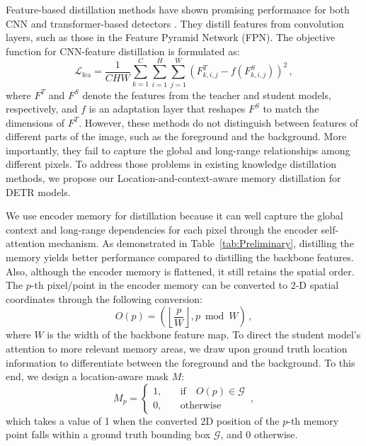 Feature-based distillation methods have shown promising performance for both CNN and transformer-based detectors \cite{wang2019distilling, yang2022focal, chang2023detrdistill}. They distill features from convolution layers, such as those in the Feature Pyramid Network (FPN). The objective function for CNN-feature distillation is formulated as:
\begin{equation}
\mathcal{L}_{\text{fea}} = \frac{1}{CHW} \sum_{k=1}^{C} \sum_{i=1}^{H} \sum_{j=1}^{W} \left( F^T_{k,i,j} - f(F^S_{k,i,j}) \right)^2 \,,
\end{equation}
\noindent where $F^T$ and $F^S$ denote the features from the teacher and student models, respectively, and $f$ is an adaptation layer that reshapes $F^S$ to match the dimensions of $F^T$. However, these methods do not distinguish between features of different parts of the image, such as the foreground and the background. More importantly, they fail to capture the global and long-range relationships among different pixels. To address those problems in existing knowledge distillation methods, we propose our Location-and-context-aware memory distillation for DETR models.

We use encoder memory for distillation because it can well capture the global context and long-range dependencies for each pixel through the encoder self-attention mechanism. As demonstrated in Table~\ref{tab:Preliminary}, distilling the memory yields better performance compared to distilling the backbone features. Also, although the encoder memory is flattened, it still retains the spatial order. The $p$-th pixel/point in the encoder memory can be converted to 2-D spatial coordinates through the following conversion:
\begin{equation}
    O(p) = (\left\lfloor \frac{p}{W} \right\rfloor, p\bmod W) \,,
\end{equation}
\noindent where $W$ is the width of the backbone feature map. %
To direct the student model's attention to more relevant memory areas, we draw upon ground truth location information to differentiate between the foreground and the background. To this end, we design a location-aware mask $M$:
\begin{equation}
M_{p}= \left\{
\begin{array}{cl}
1,\quad & \text{if} \quad O(p)\in \mathcal{G}\\
0,\quad & \text{otherwise}
\end{array} \right. \,,
\end{equation}
\noindent which takes a value of 1 when the converted 2D position of the $p$-th memory point falls within a ground truth bounding box $\mathcal{G}$, and 0 otherwise.

